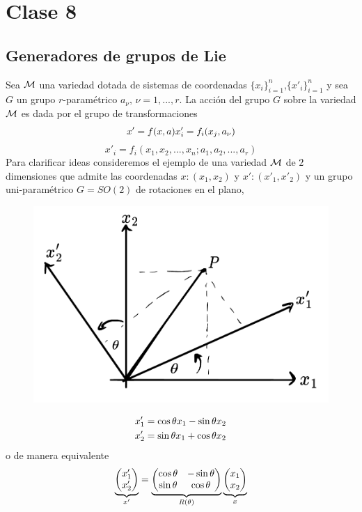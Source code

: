 \section{Clase 8}
\subsection{Generadores de grupos de Lie}
Sea $\mathcal{M}$ una variedad dotada de  sistemas de coordenadas $\{x_i\}_{i=1}^n$,$\{x'_i\}_{i=1}^n$ y sea $G$ un grupo $r$-paramétrico $a_\nu,\, \nu=1,...,r$. La acción del grupo $G$ sobre la variedad $\mathcal{M}$ es dada por el grupo de transformaciones 
\begin{equation}
  x'=f(x,a)  x'_i=f_i(x_j,a_\nu )
\end{equation}
\begin{equation}
  x'_i=f_i(x_1,x_2,...,x_n; a_1,a_2,...,a_r)
\end{equation}
Para clarificar ideas consideremos el ejemplo de una variedad $\mathcal{M}$ de $2$ dimensiones que admite las coordenadas $x:(x_1,x_2)$ y $x':(x'_1,x'_2)$ y un grupo uni-paramétrico $G=SO(2)$ de rotaciones en el plano,

\begin{figure}[h!]
	\centering
	\includegraphics[scale=0.5]{sistema-coord.pdf}
\end{figure}

\begin{align}
  x'_1&=\cos\theta x_1-\sin\theta x_2\\
  x'_2&=\sin\theta x_1+\cos\theta x_2
\end{align}
o de manera equivalente
\begin{equation}
  \underbrace{\mqty(x_1'\\x'_2)}_{x'}=\underbrace{\mqty(\cos\th&-\sin\th\\\sin\th&\cos\th)}_{R(\th)}\underbrace{\mqty(x_1\\x_2)}_{x}
\end{equation}

